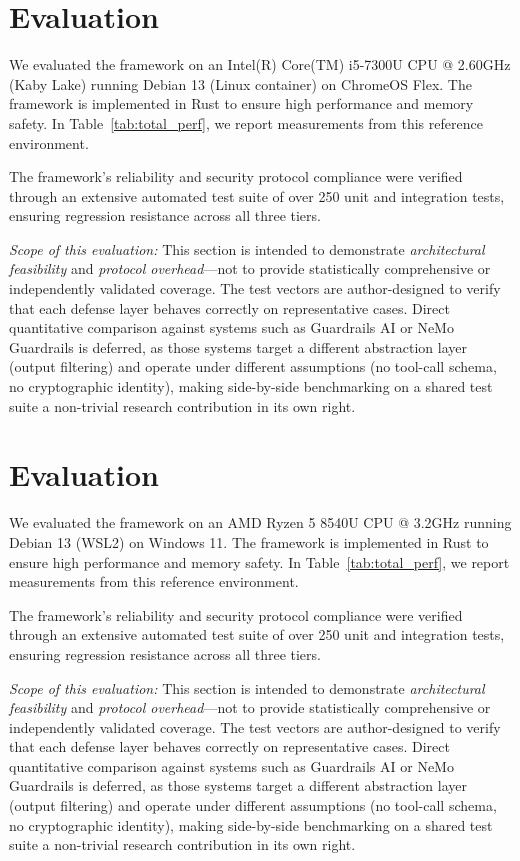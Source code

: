 \documentclass[conference]{IEEEtran}
\begin{document}
\section{Evaluation}
We evaluated the framework on an Intel(R) Core(TM) i5-7300U CPU @ 2.60GHz (Kaby Lake) running Debian 13 (Linux container) on ChromeOS Flex. The framework is implemented in Rust to ensure high performance and memory safety. In Table~\ref{tab:total_perf}, we report measurements from this reference environment.

The framework's reliability and security protocol compliance were verified through an extensive automated test suite of over 250 unit and integration tests, ensuring regression resistance across all three tiers.

\textit{Scope of this evaluation:} This section is intended to demonstrate \textit{architectural feasibility} and \textit{protocol overhead}---not to provide statistically comprehensive or independently validated coverage. The test vectors are author-designed to verify that each defense layer behaves correctly on representative cases. Direct quantitative comparison against systems such as Guardrails AI or NeMo Guardrails is deferred, as those systems target a different abstraction layer (output filtering) and operate under different assumptions (no tool-call schema, no cryptographic identity), making side-by-side benchmarking on a shared test suite a non-trivial research contribution in its own right.

\section{Evaluation}
We evaluated the framework on an AMD Ryzen 5 8540U CPU @ 3.2GHz running Debian 13 (WSL2) on Windows 11. The framework is implemented in Rust to ensure high performance and memory safety. In Table~\ref{tab:total_perf}, we report measurements from this reference environment.

The framework's reliability and security protocol compliance were verified through an extensive automated test suite of over 250 unit and integration tests, ensuring regression resistance across all three tiers.

\textit{Scope of this evaluation:} This section is intended to demonstrate \textit{architectural feasibility} and \textit{protocol overhead}---not to provide statistically comprehensive or independently validated coverage. The test vectors are author-designed to verify that each defense layer behaves correctly on representative cases. Direct quantitative comparison against systems such as Guardrails AI or NeMo Guardrails is deferred, as those systems target a different abstraction layer (output filtering) and operate under different assumptions (no tool-call schema, no cryptographic identity), making side-by-side benchmarking on a shared test suite a non-trivial research contribution in its own right.
\end{document}
